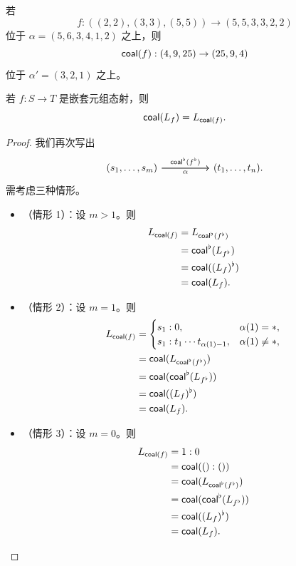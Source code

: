 \begin{example}
    若
    \[f:((2,2),(3,3),(5,5)) \to (5,5,3,3,2,2)\]
    位于 $\alpha = (5,6,3,4,1,2)$ 之上，则
    \[
    \mathsf{coal}(f):(4,9,25) \to (25,9,4)
    \]
    位于 $\alpha' = (3,2,1)$ 之上。
\end{example}

\begin{proposition}\label{coalesceagreement}
    若 $f:S \to T$ 是嵌套元组态射，则
    \[
    \mathsf{coal}(L_f) = L_{\mathsf{coal}(f)}.
    \]
\end{proposition}

\begin{proof}
我们再次写出
    \[ \begin{tikzcd}
    (s_1,\dots,s_m) \ar[rr,"\coalesce^\flat(f^\flat)"] \ar[rr,swap,"\alpha"] & & (t_1,\dots,t_n).
    \end{tikzcd} \]
    需考虑三种情形。
    \begin{itemize}
        \item （情形 1）：设 $m > 1$。则
        \begin{align*}
        L_{\mathsf{coal}(f)} & = L_{\mathsf{coal}^\flat(f^\flat)}\\
        & = \mathsf{coal}^\flat(L_{f^\flat})\\
        & = \mathsf{coal}((L_f)^\flat)\\
        & = \mathsf{coal}(L_f).
    \end{align*}
    \item （情形 2）：设 $m = 1$。则
    \begin{align*}
        L_{\mathsf{coal}(f)} & =
        \begin{cases}
          s_1:0, & \alpha(1)=*,\\
          s_1:t_1\cdots t_{\alpha(1)-1}, & \alpha(1)\neq *,
        \end{cases}\\
        & = \mathsf{coal}(L_{\mathsf{coal}^\flat(f^\flat)})\\
        & = \mathsf{coal}(\mathsf{coal}^\flat(L_{f^\flat}))\\
        & = \mathsf{coal}((L_f)^\flat)\\
        & = \mathsf{coal}(L_f).
    \end{align*}
    \item （情形 3）：设 $m = 0$。则
    \begin{align*}
        L_{\mathsf{coal}(f)} & = 1:0 \\
        & = \mathsf{coal}(():())\\
        &= \mathsf{coal}(L_{\mathsf{coal}^\flat(f^\flat)})\\
        & = \mathsf{coal}(\mathsf{coal}^\flat(L_{f^\flat}))\\
        & = \mathsf{coal}((L_f)^\flat)\\
        & = \mathsf{coal}(L_f).
    \end{align*}
    \end{itemize}

\end{proof}

